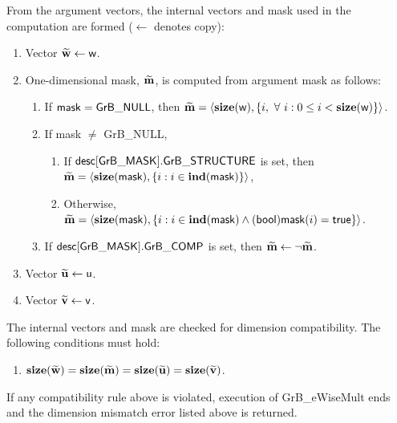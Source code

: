 From the argument vectors, the internal vectors and mask used in 
the computation are formed ($\leftarrow$ denotes copy):
\begin{enumerate}
	\item Vector ${\bf \widetilde{w}} \leftarrow {\sf w}$.

	\item One-dimensional mask, ${\bf \widetilde{m}}$, is computed from 
    argument {\sf mask} as follows:
	\begin{enumerate}
		\item If ${\sf mask} = {\sf GrB\_NULL}$, then ${\bf \widetilde{m}} = 
        \langle \bold{size}({\sf w}), \{i, \ \forall \ i : 0 \leq i < 
        \bold{size}({\sf w}) \} \rangle$.

		\item If {\sf mask} $\ne$ {\sf GrB\_NULL},  
        \begin{enumerate}
            \item If ${\sf desc[GrB\_MASK].GrB\_STRUCTURE}$ is set, then
            ${\bf \widetilde{m}} = 
            \langle \bold{size}({\sf mask}), \{i : i \in \bold{ind}({\sf mask}) \} \rangle$,
            \item Otherwise, ${\bf \widetilde{m}} = 
            \langle \bold{size}({\sf mask}), \{i : i \in \bold{ind}({\sf mask}) \wedge
            ({\sf bool}){\sf mask}(i) = {\sf true} \} \rangle$.
        \end{enumerate}

		\item	If ${\sf desc[GrB\_MASK].GrB\_COMP}$ is set, then 
        ${\bf \widetilde{m}} \leftarrow \neg {\bf \widetilde{m}}$.
	\end{enumerate}

	\item Vector ${\bf \widetilde{u}} \leftarrow {\sf u}$.

	\item Vector ${\bf \widetilde{v}} \leftarrow {\sf v}$.
\end{enumerate}

The internal vectors and mask are checked for dimension compatibility. 
The following conditions must hold:
\begin{enumerate}
	\item $\bold{size}({\bf \widetilde{w}}) = \bold{size}({\bf \widetilde{m}})
    = \bold{size}({\bf \widetilde{u}}) = \bold{size}({\bf \widetilde{v}})$.
\end{enumerate}
If any compatibility rule above is violated, execution of {\sf GrB\_eWiseMult} ends and 
the dimension mismatch error listed above is returned.

